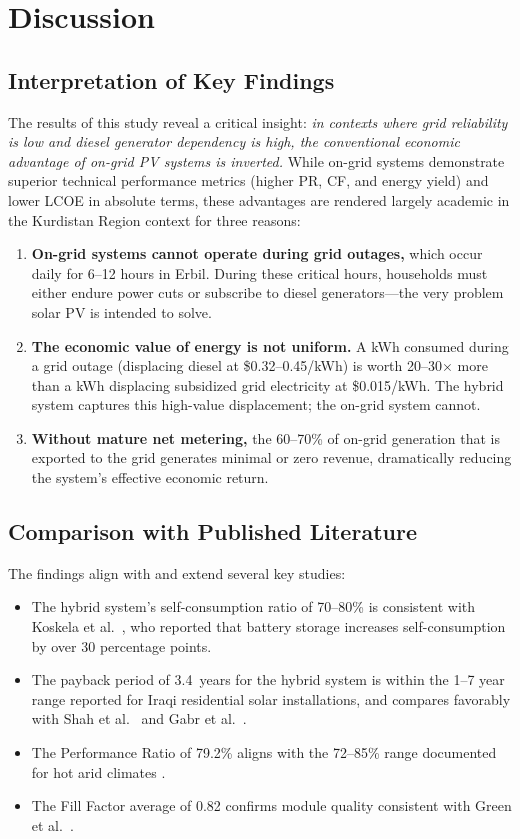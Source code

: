 \section{Discussion}

\subsection{Interpretation of Key Findings}

The results of this study reveal a critical insight: \textit{in contexts where grid reliability is low and diesel generator dependency is high, the conventional economic advantage of on-grid PV systems is inverted.} While on-grid systems demonstrate superior technical performance metrics (higher PR, CF, and energy yield) and lower LCOE in absolute terms, these advantages are rendered largely academic in the Kurdistan Region context for three reasons:

\begin{enumerate}
    \item \textbf{On-grid systems cannot operate during grid outages,} which occur daily for 6--12 hours in Erbil. During these critical hours, households must either endure power cuts or subscribe to diesel generators---the very problem solar PV is intended to solve.
    \item \textbf{The economic value of energy is not uniform.} A kWh consumed during a grid outage (displacing diesel at \$0.32--0.45/kWh) is worth 20--30$\times$ more than a kWh displacing subsidized grid electricity at \$0.015/kWh. The hybrid system captures this high-value displacement; the on-grid system cannot.
    \item \textbf{Without mature net metering,} the 60--70\% of on-grid generation that is exported to the grid generates minimal or zero revenue, dramatically reducing the system's effective economic return.
\end{enumerate}


\subsection{Comparison with Published Literature}

The findings align with and extend several key studies:

\begin{itemize}
    \item The hybrid system's self-consumption ratio of 70--80\% is consistent with Koskela et al.\ \cite{koskela2019}, who reported that battery storage increases self-consumption by over 30 percentage points.
    \item The payback period of 3.4~years for the hybrid system is within the 1--7 year range reported for Iraqi residential solar installations, and compares favorably with Shah et al.\ \cite{shah2015} and Gabr et al.\ \cite{gabr2021}.
    \item The Performance Ratio of 79.2\% aligns with the 72--85\% range documented for hot arid climates \cite{skoplaki2009}.
    \item The Fill Factor average of 0.82 confirms module quality consistent with Green et al.\ \cite{green2022}.
\end{itemize}


